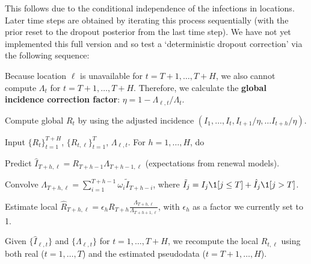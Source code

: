 \documentclass[12pt]{article}
\begin{document}
This follows due to the conditional independence of the infections in locations.
Later time steps are obtained by iterating this process sequentially (with the
prior reset to the dropout posterior from the last time step). We have not yet
implemented this full version and so test a `deterministic dropout correction'
via the following sequence:

\bitem
\item Because location $\ell$ is unavailable for $t=T+1,\ldots,T+H$, we also
cannot compute $\Lambda_t$ for $t=T+1,\ldots,T+H$. Therefore, we calculate the
{\bf global incidence correction factor}: $\eta = 1 - \Lambda_{\ell,
t}/\Lambda_{t}$. 
\item Compute global $R_t$ by using the adjusted incidence $(I_1,\ldots,I_t, I_{t+1} / \eta, \ldots
I_{t+h} / \eta).$
\item Input $\{R_t\}_{t=1}^{T+H}$, $\{R_{t, \ell}\}_{t=1}^{T}$, $\Lambda_{\ell,t}$.
For $h = 1,\ldots,H$, do
\benum
\item Predict $\hat{I}_{T + h, \ell} = R_{T+h-1}\Lambda_{T+h-1, \ell}$ (expectations from renewal models).
\item Convolve $\Lambda_{T+h, \ell} = \sum_{i=1}^{T+h-1} \omega_{i}\tilde{I}_{T + h
- i}$, where $\tilde{I}_j = I_j \1[j\leq T] + \hat{I}_j \1[j>T]$.
\item Estimate local $\hat{R}_{T+h, \ell} = \epsilon_{h} R_{T+h} \frac{\Lambda_{T+h, \ell}}
{\Lambda_{T+h+1, \ell}}$, with $\epsilon_h$ as a factor we currently set to 1.
\eenum
\item Given $\{\hat{I}_{\ell, t}\}$ and $\{\Lambda_{\ell,t}\}$ for $t=1,\ldots,T+H$, we
recompute the local $R_{t,\ell}$ using both real ($t=1,\ldots,T$) and the
estimated pseudodata ($t=T+1,\ldots,H$).
\eitem
\end{document}
